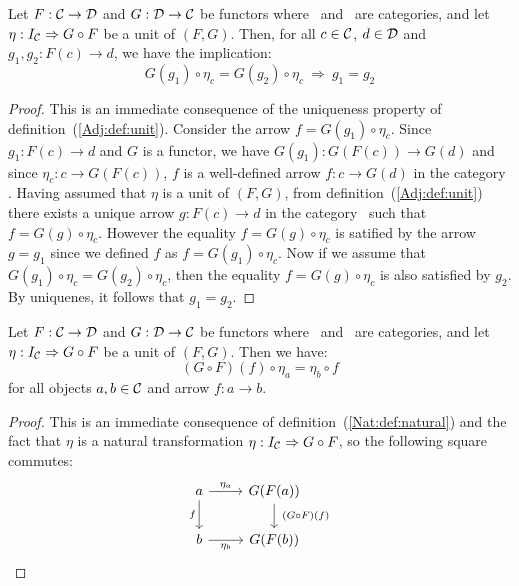 \begin{prop}\label{Adj:prop:unit:proving:equality}
    Let $F:\mbox{$\cal C$}\to\mbox{$\cal D$}$ and $G:\mbox{$\cal D$}\to\mbox{$\cal C$}$ be functors where \Cat\ and \Dat\ 
    are categories, and let $\eta:I_{\cal C}\Rightarrow G\circ F$ be a unit 
    of $(F,G)$. Then, for all $c\in\mbox{$\cal C$}$, $d\in\mbox{$\cal D$}$ and $g_{1},g_{2}:F(c)\to d$,
    we have the implication:
        \[
            G(g_{1})\circ\eta_{c} = G(g_{2})\circ\eta_{c}\ 
            \Rightarrow\ 
            g_{1}=g_{2}
        \]
\end{prop}
\begin{proof}
    This is an immediate consequence of the uniqueness property of
    definition~(\ref{Adj:def:unit}). Consider the arrow 
    $f=G(g_{1})\circ\eta_{c}$. Since $g_{1}:F(c)\to d$ and $G$ is a 
    functor, we have 
    $G(g_{1}):G(F(c))\to G(d)$ and since $\eta_{c}:c\to G(F(c))$, $f$
    is a well-defined arrow $f:c\to G(d)$ in the category \Cat. Having
    assumed that $\eta$ is a unit of $(F,G)$, from 
    definition~(\ref{Adj:def:unit}) there exists a unique arrow 
    $g:F(c)\to d$ in the category \Dat\ such that $f=G(g)\circ\eta_{c}$.
    However the equality $f=G(g)\circ\eta_{c}$ is satified by the 
    arrow $g=g_{1}$ since we defined $f$ as $f=G(g_{1})\circ\eta_{c}$.
    Now if we assume that $G(g_{1})\circ\eta_{c}=G(g_{2})\circ\eta_{c}$,
    then the equality $f=G(g)\circ\eta_{c}$ is also satisfied by $g_{2}$.
    By uniquenes, it follows that $g_{1}=g_{2}$.
\end{proof}

\begin{prop}\label{Adj:prop:unit:natural}
    Let $F:\mbox{$\cal C$}\to\mbox{$\cal D$}$ and $G:\mbox{$\cal D$}\to\mbox{$\cal C$}$ be functors where \Cat\ and \Dat\ 
    are categories, and let $\eta:I_{\cal C}\Rightarrow G\circ F$ be a unit 
    of $(F,G)$. Then we have:
        \[
            (G\circ F)(f)\circ\eta_{a}=\eta_{b}\circ f
        \]
    for all objects $a,b\in\mbox{$\cal C$}$ and arrow $f:a\to b$.
\end{prop}
\begin{proof}
    This is an immediate consequence of definition~(\ref{Nat:def:natural}) 
    and the fact that $\eta$ is a natural transformation 
    $\eta:I_{\cal C}\Rightarrow G\circ F$, so the following square commutes:
    \[
        \begin{tikzcd}
            a\arrow[r, "\eta_{a}"]\arrow[d, swap,"f"]
            &G(F(a))\arrow[d, "\ (G\circ F)(f)"]
            \\
            b\arrow[r, swap, "\eta_{b}"]
            &G(F(b))
        \end{tikzcd}
    \]
\end{proof}

